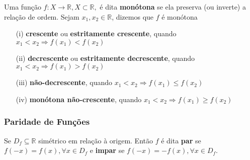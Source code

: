 \begin{tcolorbox}
\begin{defi}
Uma função $f: X \longrightarrow\mathbb{R}, X\subset\mathbb{R},$ é
dita \textbf{monótona} se ela preserva (ou inverte) a relação de
ordem. Sejam $x_1,x_2\in \mathbb{R}$, dizemos que $f$ é monótona
\begin{enumerate}
\item [(i)] \textbf{crescente} ou \textbf{estritamente crescente}, quando
$x_1<x_2 \Rightarrow f(x_1)<f(x_2)$
\item [(ii)]\textbf{decrescente} ou \textbf{estritamente decrescente}, quando
$x_1<x_2 \Rightarrow f(x_1)>f(x_2)$
\item [(iii)] \textbf{não-decrescente}, quando
$x_1<x_2 \Rightarrow f(x_1)\leq f(x_2)$
\item [(iv)]\textbf{monótona não-crescente}, quando
$x_1<x_2 \Rightarrow f(x_1)\geq f(x_2)$
\end{enumerate}
\end{defi}
\end{tcolorbox}

\begin{tcolorbox}

\subsubsection*{Paridade de Funções}
\begin{defi} Se $D_{f} \subseteq \mathbb{R}$ simétrico em relação à origem. Então $f$ é dita \textbf{par} se  $f(-x) = f(x), \forall x \in D_f$ e \textbf{impar} se $f(-x) = -f(x), \forall x \in D_f$.

\begin{figure}[H]
\centering
\subfigure{
    }
    \qquad
\subfigure{
}
\end{figure}
\end{defi}
\end{tcolorbox}